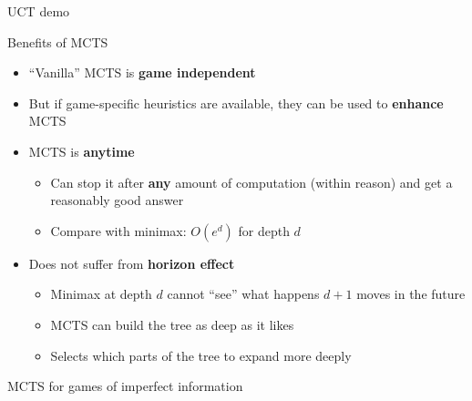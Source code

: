 \begin{frame}{UCT demo}
\end{frame}

\begin{frame}{Benefits of MCTS}
	\begin{itemize}
		\pause\item ``Vanilla'' MCTS is \textbf{game independent}
		\pause\item But if game-specific heuristics are available, they can be used to \textbf{enhance} MCTS
		\pause\item MCTS is \textbf{anytime}
			\begin{itemize}
				\pause\item Can stop it after \textbf{any} amount of computation (within reason) and get a reasonably good answer
				\pause\item Compare with minimax: $O(e^d)$ for depth $d$
			\end{itemize}
		\pause\item Does not suffer from \textbf{horizon effect}
			\begin{itemize}
				\pause\item Minimax at depth $d$ cannot ``see'' what happens $d+1$ moves in the future
				\pause\item MCTS can build the tree as deep as it likes
				\pause\item Selects which parts of the tree to expand more deeply
			\end{itemize}
	\end{itemize}
\end{frame}

\begin{frame}{MCTS for games of imperfect information}
\end{frame}

